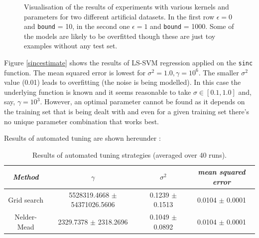 \begin{figure}[h]
\qquad
{}\qquad
\caption{Visualisation of the results of experiments with various kernels and parameters for two different artificial datasets. In the first row $\epsilon=0$ and \texttt{bound} = 10, in the second one $\epsilon=1$ and \texttt{bound} = 1000. Some of the models are likely to be overfitted though these are just toy examples without any test set.}
\label{functionestimation}
\end{figure}


Figure \ref{sincestimate} shows the results of LS-SVM regression applied on the \texttt{sinc} function. The mean squared error is lowest for $\sigma^2=1.0,\gamma=10^6$. The smaller $\sigma^2$ value (0.01) leads to overfitting (the noise is being modelled). In this case the underlying function is known and it seems reasonable to take $\sigma\in[0.1,1.0]$ and, say, $\gamma=10^3$. However, an optimal parameter cannot be found as it depends on the training set that is being dealt with and even for a given training set there's no unique parameter combination that works best.

\par Results of automated tuning are shown hereunder :

\begin{table}[h]
\centering
\begin{tabular}{c|ccc}
\textit{Method} & $\gamma$ & $\sigma^2$ & \textit{mean squared error} \\
\hline
Grid search & 5528319.4668 $\pm$ 54371026.5606 & 0.1239 $\pm$  0.1513 & 0.0104 $\pm$ 0.0001\\
Nelder-Mead & 2329.7378 $\pm$ 2318.2696 & 0.1049 $\pm$ 0.0892 &  0.0104 $\pm$ 0.0001\\
\end{tabular}
\caption{Results of automated tuning strategies (averaged over 40 runs).}
\label{automatedtuning}
\end{table}

